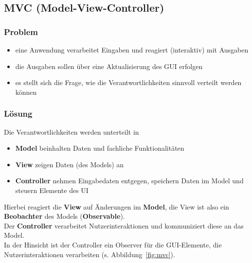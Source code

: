 \subsection{MVC (Model-View-Controller)}

\subsubsection*{Problem}

\begin{itemize}
    \item eine Anwendung verarbeitet Eingaben und reagiert (interaktiv) mit Ausgaben
    \item die Ausgaben sollen über eine Aktualisierung des GUI erfolgen
    \item es stellt sich die Frage, wie die Verantwortlichkeiten sinnvoll verteilt werden können
\end{itemize}

\subsubsection*{Lösung}
Die Verantwortlichkeiten werden unterteilt in

\begin{itemize}
    \item \textbf{Model} beinhalten Daten und fachliche Funktionalitäten
    \item \textbf{View} zeigen Daten (des Models) an
    \item \textbf{Controller} nehmen Eingabedaten entgegen, speichern Daten im Model und steuern Elemente des UI
\end{itemize}

\noindent
Hierbei reagiert die \textbf{View} auf Änderungen im \textbf{Model}, die View ist also ein \textbf{Beobachter} des Models (\textbf{Observable}).\\
Der \textbf{Controller} verarbeitet Nutzerinteraktionen und kommuniziert diese an das Model.\\
In der Hinsicht ist der Controller ein Observer für die GUI-Elemente, die Nutzerinteraktionen verarbeiten (s. Abbildung~\ref{fig:mvc}).

